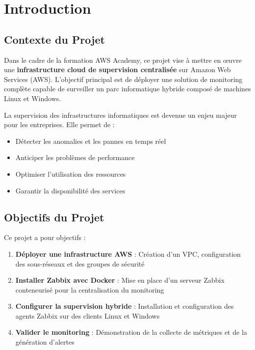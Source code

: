 \chapter{Introduction}
\label{chap:introduction}

\section{Contexte du Projet}

Dans le cadre de la formation AWS Academy, ce projet vise à mettre en œuvre une \textbf{infrastructure cloud de supervision centralisée} sur Amazon Web Services (AWS). L'objectif principal est de déployer une solution de monitoring complète capable de surveiller un parc informatique hybride composé de machines Linux et Windows.

La supervision des infrastructures informatiques est devenue un enjeu majeur pour les entreprises. Elle permet de :
\begin{itemize}
    \item Détecter les anomalies et les pannes en temps réel
    \item Anticiper les problèmes de performance
    \item Optimiser l'utilisation des ressources
    \item Garantir la disponibilité des services
\end{itemize}

\section{Objectifs du Projet}

Ce projet a pour objectifs :

\begin{enumerate}
    \item \textbf{Déployer une infrastructure AWS} : Création d'un VPC, configuration des sous-réseaux et des groupes de sécurité
    \item \textbf{Installer Zabbix avec Docker} : Mise en place d'un serveur Zabbix conteneurisé pour la centralisation du monitoring
    \item \textbf{Configurer la supervision hybride} : Installation et configuration des agents Zabbix sur des clients Linux et Windows
    \item \textbf{Valider le monitoring} : Démonstration de la collecte de métriques et de la génération d'alertes
\end{enumerate}

